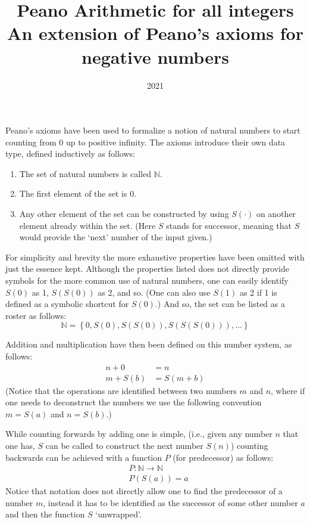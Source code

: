 \documentclass{article}
\title{Peano Arithmetic for all integers\\[2pt]
\large An extension of Peano's axioms for negative numbers}
\author{}
\date{2021}
\newcommand{\N}{\mathbb{N}}
\begin{document}
\maketitle

Peano's axioms have been used to formalize a notion of natural numbers to start counting from 0 up to positive infinity. The axioms introduce their own data type, defined inductively as follows:
\begin{enumerate}
\item The set of natural numbers is called $\mathbb{N}$.
\item The first element of the set is 0.
\item Any other element of the set can be constructed by using $S(\cdot)$ on another element already within the set. (Here $S$ stands for successor, meaning that $S$ would provide the `next' number of the input given.)
\end{enumerate}

For simplicity and brevity the more exhaustive properties have been omitted with just the essence kept. Although the properties listed does not directly provide symbols for the more common use of natural numbers, one can easily identify $S(0)$ as 1, $S(S(0))$ as 2, and so. (One can also use $S(1)$ as 2 if 1 is defined as a symbolic shortcut for $S(0)$.)
And so, the set can be listed as a roster as follows:
\[\mathbb{N} = \left\{0, S(0), S(S(0)), S(S(S(0))), \dots\right\}\]

Addition and multiplication have then been defined on this number system, as follows:
\begin{align}
n + 0 &= n \\
m + S(b) &= S(m + b)
\end{align}
(Notice that the operations are identified between two numbers $m$ and $n$, where if one needs to deconstruct the numbers we use the following convention $m = S(a)$ and $n = S(b)$.)

While counting forwards by adding one is simple, (i.e., given any number $n$ that one has, $S$ can be called to construct the next number $S(n)$) counting backwards can be achieved with a function $P$ (for predecessor) as follows:
\begin{align}
&{} P : \N \to \N \\
&{} P(S(a)) = a
\end{align}
Notice that notation does not directly allow one to find the predecessor of a number $m$, instead it has to be identified as the successor of some other number $a$ and then the function $S$ `unwrapped'.
\end{document}
